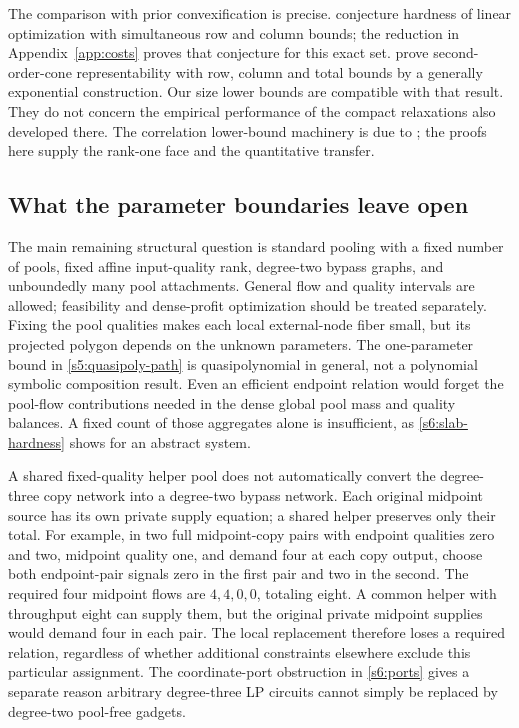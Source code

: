 The comparison with prior convexification is precise.
\citet[Section~3.1, after Theorem~4]
{dey2020-convexifications-of-rank-one-based} conjecture hardness of linear
optimization with simultaneous row and column bounds; the reduction in
Appendix~\ref{app:costs} proves that conjecture for this exact set.
\citet[Theorem~2]{s6:jalilian2026} prove second-order-cone
representability with row, column and total bounds by a generally
exponential construction. Our size lower bounds are compatible with
that result. They do not concern the empirical performance of the
compact relaxations also developed there. The correlation lower-bound
machinery is due to \citet{s6:fawzi2013,s6:lrs-full,s6:bfps2015}; the
proofs here supply the rank-one face and the quantitative transfer.

\subsection{What the parameter boundaries leave open}\label{s6:open}
The main remaining structural question is standard pooling with a fixed
number of pools, fixed affine input-quality rank, degree-two bypass
graphs, and unboundedly many pool attachments. General flow and quality
intervals are allowed; feasibility and dense-profit optimization should
be treated separately. Fixing the pool qualities makes each local
external-node fiber small, but its projected polygon depends on the
unknown parameters. The one-parameter bound in \cref{s5:quasipoly-path}
is quasipolynomial in general, not a polynomial symbolic composition
result. Even an efficient endpoint relation would forget the pool-flow
contributions needed in the dense global pool mass and quality balances.
A fixed count of those aggregates alone is insufficient, as
\cref{s6:slab-hardness} shows for an abstract system.

A shared fixed-quality helper pool does not automatically convert the
degree-three copy network into a degree-two bypass network. Each original
midpoint source has its own private supply equation; a shared helper
preserves only their total. For example, in two full midpoint-copy
pairs with endpoint qualities zero and two, midpoint quality one,
and demand four at each copy output, choose both endpoint-pair signals
zero in the first pair and two in the second. The required four midpoint
flows are $4,4,0,0$, totaling eight. A common helper with throughput eight
can supply them, but the original private midpoint supplies would demand
four in each pair. The local replacement therefore loses a required
relation, regardless of whether additional constraints elsewhere exclude
this particular assignment. The coordinate-port obstruction in
\cref{s6:ports} gives a separate reason arbitrary degree-three LP circuits
cannot simply be replaced by degree-two pool-free gadgets.

